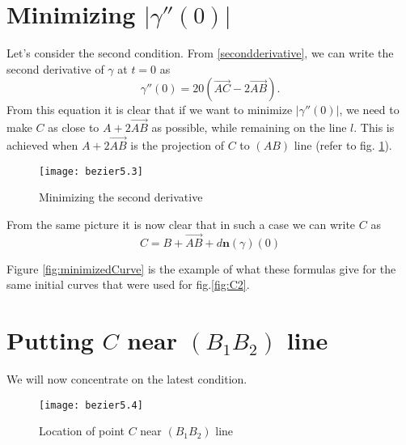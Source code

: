 \documentclass[12pt,a4paper]{article}
\newcommand{\vc}{\overrightarrow}
\begin{document}
\section{Minimizing $|\gamma''(0)|$}

Let's consider the second condition. From \eqref{secondderivative}, we can write the second derivative of $\gamma$ at $t=0$ as
$$
\gamma''(0) = 20(\vc{AC} - 2\vc{AB}).
$$
From this equation it is clear that if we want to minimize $|\gamma''(0)|$, we need to make $C$ as close to $A + 2\vc{AB}$ as possible, while remaining on the line $l$. This is achieved when $A + 2\vc{AB}$ is the projection of $C$ to $(AB)$ line (refer to fig. \ref{fig:minimize}).

\begin{figure}[h]
  \caption{Minimizing the second derivative}
  \label{fig:minimize}
  \texttt{[image: bezier5.3]}
  \centering
\end{figure}

From the same picture it is now clear that in such a case we can write $C$ as
\begin{equation}\label{Cbyminimize}
  C = B + \vc{AB} + d\mathbf{n}(\gamma)(0)
\end{equation}

Figure \ref{fig:minimizedCurve} is the example of what these formulas give for the same initial curves that were used for fig.\ref{fig:C2}.

\section{Putting $C$ near $(B_1B_2)$ line}

We will now concentrate on the latest condition.

\begin{figure}[h]
  \caption{Location of point $C$ near $(B_1B_2)$ line}
  \label{fig:nearest}
  \texttt{[image: bezier5.4]}
  \centering
\end{figure}
\end{document}
